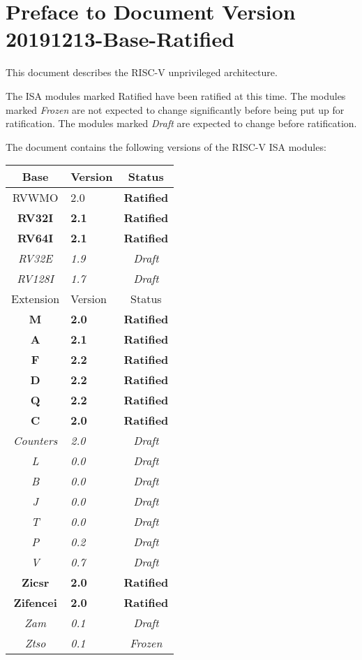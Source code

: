 \section*{Preface to Document Version 20191213-Base-Ratified}

This document describes the RISC-V unprivileged architecture.

The ISA modules marked Ratified have been ratified at this time.  The modules
marked {\em Frozen} are not expected to change significantly before being put
up for ratification.  The modules marked {\em Draft} are expected to change
before ratification.

The document contains the following versions of the RISC-V ISA modules:

{
\begin{table}[hbt]
  \centering
  \begin{tabular}{|c|l|c|}
    \hline
    Base           & Version & Status\\
    \hline
    RVWMO          & 2.0 & \bf Ratified   \\
    \bf RV32I      & \bf 2.1 & \bf Ratified \\
    \bf RV64I      & \bf 2.1 & \bf Ratified \\
    \em RV32E      & \em 1.9 & \em Draft \\
    \em RV128I     & \em 1.7 & \em Draft \\
    \hline
    Extension      & Version & Status \\
    \hline
    \bf M          & \bf 2.0 & \bf Ratified \\
    \bf A          & \bf 2.1 & \bf Ratified \\
    \bf F          & \bf 2.2 & \bf Ratified \\
    \bf D          & \bf 2.2 & \bf Ratified \\
    \bf Q          & \bf 2.2 & \bf Ratified \\
    \bf C          & \bf 2.0 & \bf Ratified \\
    \em Counters   & \em 2.0 & \em Draft \\
    \em L          & \em 0.0 & \em Draft \\
    \em B          & \em 0.0 & \em Draft \\
    \em J          & \em 0.0 & \em Draft \\
    \em T          & \em 0.0 & \em Draft \\
    \em P          & \em 0.2 & \em Draft \\
    \em V          & \em 0.7 & \em Draft \\
    \bf Zicsr      & \bf 2.0 & \bf Ratified \\
    \bf Zifencei   & \bf 2.0 & \bf Ratified \\
    \em Zam        & \em 0.1 & \em Draft \\
    \em Ztso       & \em 0.1 & \em Frozen \\
    \hline
  \end{tabular}
\end{table}
}


